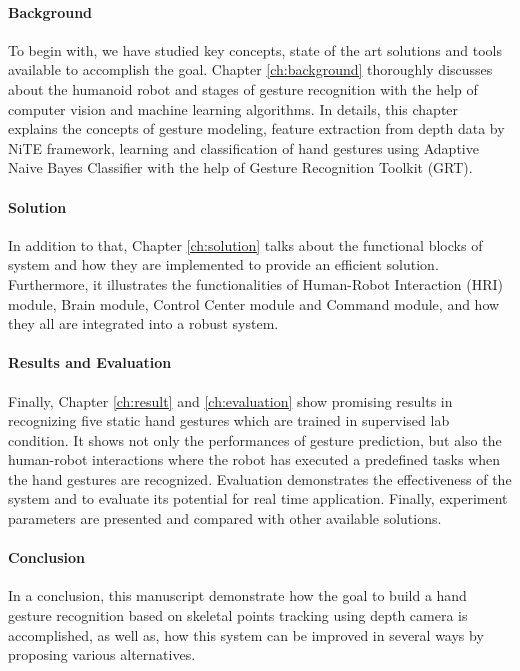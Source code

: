 \paragraph*{Background} To begin with, we have studied key concepts, state of the art solutions and tools available to accomplish the goal. Chapter \ref{ch:background} thoroughly discusses about the humanoid robot and stages of gesture recognition with the help of computer vision and machine learning algorithms. In details, this chapter explains the concepts of gesture modeling, feature extraction from depth data by NiTE framework, learning and classification of hand gestures using Adaptive Naive Bayes Classifier with the help of Gesture Recognition Toolkit (GRT).

\paragraph*{Solution} In addition to that, Chapter \ref{ch:solution} talks about the functional blocks of system and how they are implemented to provide an efficient solution. Furthermore, it illustrates the functionalities of  Human-Robot Interaction (HRI) module, Brain module, Control Center module and Command module, and how they all are integrated into a robust system.

\paragraph*{Results and Evaluation} Finally, Chapter \ref{ch:result} and \ref{ch:evaluation} show promising results in recognizing five static hand gestures which are trained in supervised lab condition. It shows not only the performances of gesture prediction, but also the human-robot interactions where the robot has executed a predefined tasks when the hand gestures are recognized. Evaluation demonstrates the effectiveness of the system and to evaluate its potential for real time application. Finally, experiment parameters are presented and compared with other available solutions.

\paragraph*{Conclusion} In a conclusion, this manuscript demonstrate how the goal to build a hand gesture recognition based on skeletal points tracking using depth camera is accomplished, as well as, how this system can be improved in several ways by proposing various alternatives.